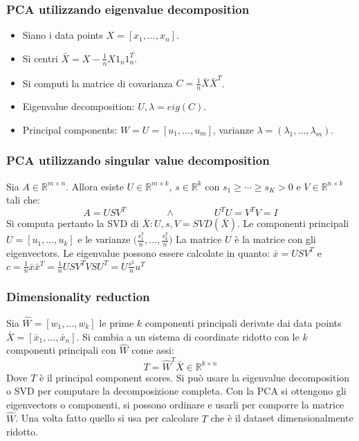 		\subsubsection{PCA utilizzando eigenvalue decomposition}
		\begin{itemize}
			\item Siano i data points $X=[x_1,\dots,x_n]$.
			\item Si centri $\bar{X} = X-\frac{1}{n}X1_n1_n^T$.
			\item Si computi la matrice di covarianza $C=\frac{1}{n}\bar{X}\bar{X}^T$.
			\item Eigenvalue decomposition: $U,\lambda = eig(C)$.
			\item Principal components: $W=U=[u_1,\dots,u_m]$, varianze $\lambda = (\lambda_1,\dots,\lambda_m)$.
		\end{itemize}

		\subsubsection{PCA utilizzando singular value decomposition}
		Sia $A\in\mathbb{R}^{m\times n}$.
		Allora esiste $U\in\mathbb{R}^{m\times k}$, $s\in\mathbb{R}^k$ con $s_1\ge\cdots\ge s_K >0$ e $V\in \mathbb{R}^{n\times k}$ tali che:
		$$A = USV^T\qquad\qquad\land\qquad\qquad U^TU=V^TV=I$$
		Si computa pertanto la SVD di $\bar{X}:U,s,V=SVD(\bar{X})$.
		Le componenti principali $U=[u_1,\dots,u_k]$ e le varianze $\bigl(\frac{s_1^2}{n},\dots,\frac{s_k^2}{n}\bigr)$
		La matrice $U$ \`e la matrice con gli eigenvectors.
		Le eigenvalue possono essere calcolate in quanto: $\bar{x} = USV^T$ e $c = \frac{1}{n}\bar{x}\bar{x}^T = \frac{1}{n}USV^TVSU^T=U\frac{s^2}{n}u^T$

		\subsubsection{Dimensionality reduction}
		Sia $\hat{W} = [w_1,\dots,w_k]$ le prime $k$ componenti principali derivate dai data points $\bar{X} = [\bar{x}_1,\dots,\bar{x}_n]$.
		Si cambia a un sistema di coordinate ridotto con le $k$ componenti principali con $\hat{W}$ come assi:
		$$T = \hat{W}^T\bar{X}\in\mathbb{R}^{k\times n}$$
		Dove $T$ \`e il principal component scores.
		Si pu\`o usare la eigenvalue decomposition o SVD per computare la decomposizione completa.
		Con la PCA si ottengono gli eigenvectors o componenti, si possono ordinare e usarli per comporre la matrice $\hat{W}$.
		Una volta fatto quello si usa per calcolare $T$ che \`e il dataset dimensionalmente ridotto.

